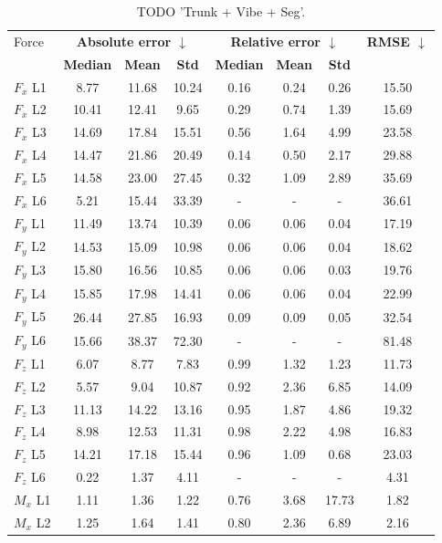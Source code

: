 \begin{table}[h]
\centering
\caption{TODO 'Trunk + Vibe + Seg'.}
\label{tab:prelim:trunk_+_vibe_+_seg.tex}
\begin{tabular}{lccccccc}
\toprule
Force & \multicolumn{3}{c}{\bfseries Absolute error $\downarrow$} & \multicolumn{3}{c}{\bfseries Relative error $\downarrow$} & \bfseries RMSE $\downarrow$ \\
  & \bfseries Median & \bfseries Mean & \bfseries Std & \bfseries Median & \bfseries Mean & \bfseries Std & \bfseries   \\
\midrule
$F_x$ L1 & 8.77 & 11.68 & 10.24 & 0.16 & 0.24 & 0.26 & 15.50 \\
$F_x$ L2 & 10.41 & 12.41 & 9.65 & 0.29 & 0.74 & 1.39 & 15.69 \\
$F_x$ L3 & 14.69 & 17.84 & 15.51 & 0.56 & 1.64 & 4.99 & 23.58 \\
$F_x$ L4 & 14.47 & 21.86 & 20.49 & 0.14 & 0.50 & 2.17 & 29.88 \\
$F_x$ L5 & 14.58 & 23.00 & 27.45 & 0.32 & 1.09 & 2.89 & 35.69 \\
$F_x$ L6 & 5.21 & 15.44 & 33.39 & - & - & - & 36.61 \\
$F_y$ L1 & 11.49 & 13.74 & 10.39 & 0.06 & 0.06 & 0.04 & 17.19 \\
$F_y$ L2 & 14.53 & 15.09 & 10.98 & 0.06 & 0.06 & 0.04 & 18.62 \\
$F_y$ L3 & 15.80 & 16.56 & 10.85 & 0.06 & 0.06 & 0.03 & 19.76 \\
$F_y$ L4 & 15.85 & 17.98 & 14.41 & 0.06 & 0.06 & 0.04 & 22.99 \\
$F_y$ L5 & 26.44 & 27.85 & 16.93 & 0.09 & 0.09 & 0.05 & 32.54 \\
$F_y$ L6 & 15.66 & 38.37 & 72.30 & - & - & - & 81.48 \\
$F_z$ L1 & 6.07 & 8.77 & 7.83 & 0.99 & 1.32 & 1.23 & 11.73 \\
$F_z$ L2 & 5.57 & 9.04 & 10.87 & 0.92 & 2.36 & 6.85 & 14.09 \\
$F_z$ L3 & 11.13 & 14.22 & 13.16 & 0.95 & 1.87 & 4.86 & 19.32 \\
$F_z$ L4 & 8.98 & 12.53 & 11.31 & 0.98 & 2.22 & 4.98 & 16.83 \\
$F_z$ L5 & 14.21 & 17.18 & 15.44 & 0.96 & 1.09 & 0.68 & 23.03 \\
$F_z$ L6 & 0.22 & 1.37 & 4.11 & - & - & - & 4.31 \\
$M_x$ L1 & 1.11 & 1.36 & 1.22 & 0.76 & 3.68 & 17.73 & 1.82 \\
$M_x$ L2 & 1.25 & 1.64 & 1.41 & 0.80 & 2.36 & 6.89 & 2.16 \\

\end{tabular}
\end{table}
